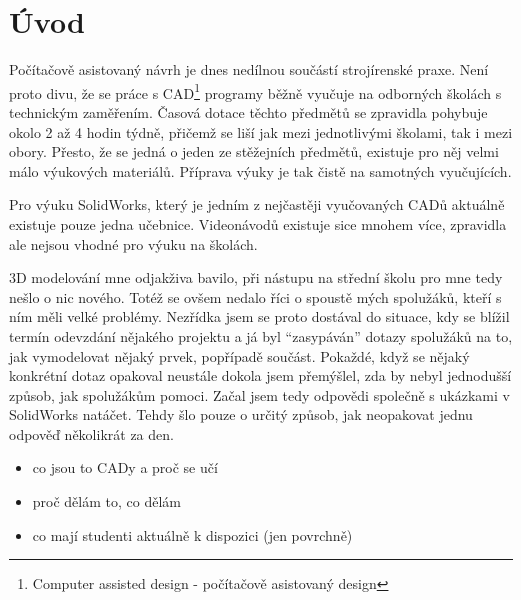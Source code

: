\chapter*{Úvod}
Počítačově asistovaný návrh je dnes nedílnou součástí strojírenské praxe.
Není proto divu, že se práce s CAD\footnote{Computer assisted design - počítačově asistovaný design} programy běžně vyučuje na odborných školách s technickým zaměřením.
Časová dotace těchto předmětů se zpravidla pohybuje okolo 2 až 4 hodin týdně, přičemž se liší jak mezi jednotlivými školami, tak i mezi obory.
Přesto, že se jedná o jeden ze stěžejních předmětů, existuje pro něj velmi málo výukových materiálů.
Příprava výuky je tak čistě na samotných vyučujících.

Pro výuku SolidWorks, který je jedním z nejčastěji vyučovaných CADů aktuálně existuje pouze jedna učebnice.
Videonávodů existuje sice mnohem více, zpravidla ale nejsou vhodné pro výuku na školách.

3D modelování mne odjakživa bavilo, při nástupu na střední školu pro mne tedy nešlo o nic nového.
Totéž se ovšem nedalo říci o spoustě mých spolužáků, kteří s ním měli velké problémy.
Nezřídka jsem se proto dostával do situace, kdy se blížil termín odevzdání nějakého projektu a já byl \enquote{zasypáván} dotazy spolužáků na to, jak vymodelovat nějaký prvek, popřípadě součást.
Pokaždé, když se nějaký konkrétní dotaz opakoval neustále dokola jsem přemýšlel, zda by nebyl jednodušší způsob, jak spolužákům pomoci.
Začal jsem tedy odpovědi společně s ukázkami v SolidWorks natáčet.
Tehdy šlo pouze o určitý způsob, jak neopakovat jednu odpověď několikrát za den.

\noindent\textcolor{mygreen}{}

\vfill
\noindent {}
\begin{itemize}[topsep=0pt]
    \setlength\itemsep{0.05em}
    \item co jsou to CADy a proč se učí
    \item proč dělám to, co dělám
    \item co mají studenti aktuálně k dispozici (jen povrchně)
\end{itemize}

\newpage

